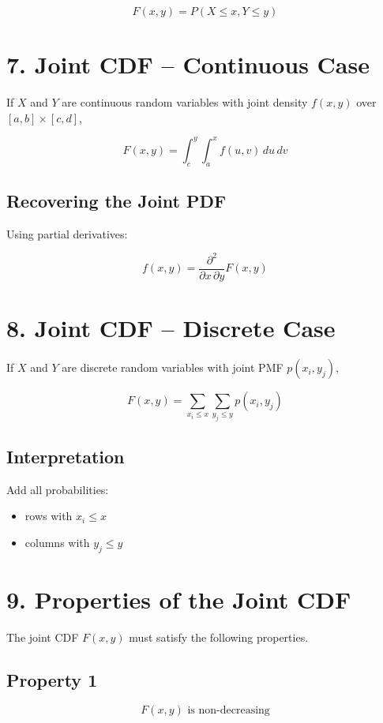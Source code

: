 \documentclass[12pt]{article}
\begin{document}
\[
F(x,y) = P(X \le x, Y \le y)
\]

\section*{7. Joint CDF -- Continuous Case}

If $X$ and $Y$ are continuous random variables with joint density $f(x,y)$ over $[a,b]\times[c,d]$,

\[
F(x,y)=\int_c^{y}\int_a^{x} f(u,v)\,du\,dv
\]

\subsection*{Recovering the Joint PDF}

Using partial derivatives:

\[
f(x,y) = \frac{\partial^2}{\partial x\,\partial y} F(x,y)
\]

\section*{8. Joint CDF -- Discrete Case}

If $X$ and $Y$ are discrete random variables with joint PMF $p(x_i,y_j)$,

\[
F(x,y)=\sum_{x_i \le x}\sum_{y_j \le y} p(x_i,y_j)
\]

\subsection*{Interpretation}

Add all probabilities:

\begin{itemize}
\item rows with $x_i \le x$
\item columns with $y_j \le y$
\end{itemize}

\section*{9. Properties of the Joint CDF}

The joint CDF $F(x,y)$ must satisfy the following properties.

\subsection*{Property 1}

\[
F(x,y) \text{ is non-decreasing}
\]
\end{document}
